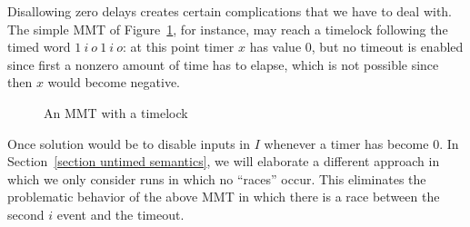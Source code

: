 Disallowing zero delays creates certain complications that we have to deal with. The simple MMT of Figure~\ref{fig:timelock}, for instance,
may reach a timelock following the timed word $1 ~ i ~ o ~ 1 ~ i ~ o$: at this point timer $x$ has value $0$, but no timeout is enabled since first a nonzero amount of time has to elapse, which is not possible since then $x$ would become negative.
\begin{figure}[ht]
\begin{center}
\caption{An MMT with a timelock}
\label{fig:timelock}
\end{center}
\end{figure}
Once solution would be to disable inputs in $I$ whenever a timer has become $0$. 
In Section~\ref{section untimed semantics}, we will elaborate
a different approach in which we only consider runs in which no ``races'' occur. This eliminates the problematic
behavior of the above MMT in which there is a race between the second $i$ event and the timeout.
\fi

